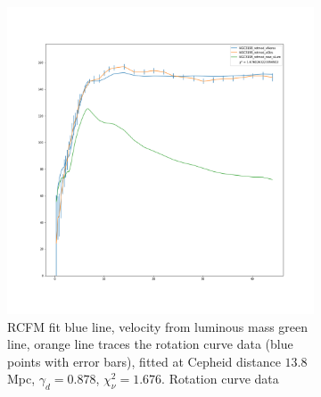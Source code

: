 \documentclass[reprint,%
 amsmath,amssymb,
 aps,
]{revtex4-1}
\begin{document}
 


    

   
   
  
    \begin{figure}[h!] 
    \begin{subfigure}[c]{0.5\linewidth}
    \centering
    \includegraphics[width=0.95\linewidth]{figures/NGC3198_rotmod_XueSofue.png}
    \caption{RCFM fit blue line,  velocity from   luminous mass    green line, orange line traces the rotation curve data (blue points with error bars), fitted at Cepheid   distance $13.8$Mpc,  $\gamma_d = 0.878$,   $\chi_\nu^2  =1.676$.  Rotation curve data \cite{2016Lelli} }
    \label{fig:NGC3198RCFM} 
  \end{subfigure}%
  \begin{subfigure}[c]{0.5\linewidth}

\end{subfigure}
\end{figure}
\end{document}

